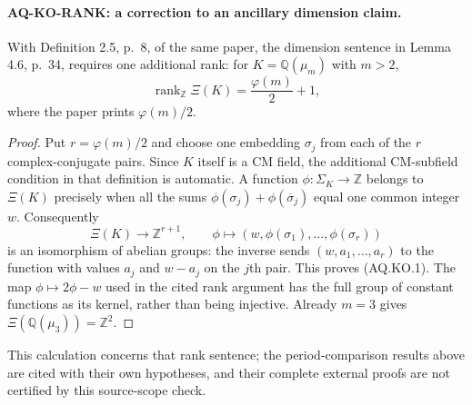 \paragraph{AQ-KO-RANK: a correction to an ancillary dimension claim.}
With Definition 2.5, p.~8, of the same paper, the dimension
sentence in Lemma 4.6, p.~34, requires one additional rank:
for $K=\mathbb Q(\mu_m)$ with $m>2$,
\[
 \operatorname{rank}_{\mathbb Z}\Xi(K)
       =\frac{\varphi(m)}2+1,
 \tag{AQ.KO.1}
\]
where the paper prints $\varphi(m)/2$.
\begin{proof}
Put $r=\varphi(m)/2$ and choose one embedding
$\sigma_j$ from each of the $r$ complex-conjugate pairs.
Since $K$ itself is a CM field, the additional CM-subfield
condition in that definition is automatic.
A function $\phi:\Sigma_K\to\mathbb Z$ belongs to
$\Xi(K)$ precisely when all the sums
$\phi(\sigma_j)+\phi(\overline\sigma_j)$ equal
one common integer $w$.
Consequently
\[
 \Xi(K)\longrightarrow\mathbb Z^{r+1},\qquad
 \phi\longmapsto(w,\phi(\sigma_1),\ldots,\phi(\sigma_r))
\]
is an isomorphism of abelian groups: the inverse sends
$(w,a_1,\ldots,a_r)$ to the function with values
$a_j$ and $w-a_j$ on the $j$th pair.
This proves (AQ.KO.1).  The map
$\phi\mapsto2\phi-w$ used in the cited rank argument
has the full group of constant functions as its kernel,
rather than being injective.  Already $m=3$ gives
$\Xi(\mathbb Q(\mu_3))=\mathbb Z^2$.
\end{proof}
This calculation concerns that rank sentence; the
period-comparison results above are cited with their
own hypotheses, and their complete external proofs
are not certified by this source-scope check.

